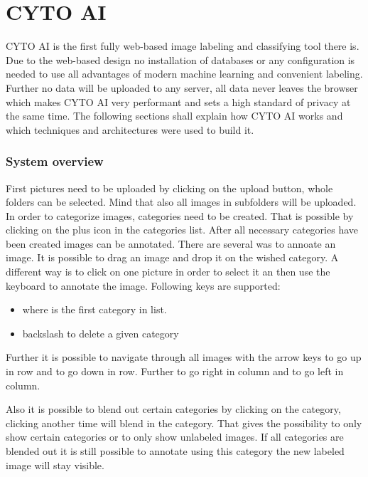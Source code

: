 \chapter{CYTO AI}
CYTO AI is the first fully web-based image labeling and classifying tool there is. Due to the web-based design no installation of databases or any configuration is needed to use all advantages of modern machine learning and convenient labeling. Further no data will be uploaded to any server, all data never leaves the browser which makes CYTO AI very performant and sets a high standard of privacy at the same time. The following sections shall explain how CYTO AI works and which techniques and architectures were used to build it.

\subsection{System overview}
First pictures need to be uploaded by clicking on the upload button, whole folders can be selected. Mind that also all images in subfolders will be uploaded. In order to categorize images, categories need to be created. That is possible by clicking on the plus icon in the categories list. After all necessary categories have been created images can be annotated. There are several was to annoate an image. It is possible to drag an image and drop it on the wished category. A different way is to click on one picture in order to select it an then use the keyboard to annotate the image. Following keys are supported:

\begin{itemize}
	\item {}      
	   where  is the first category in list.
	\item \keystroke{$\Leftarrow$} backslash to delete a given category
\end{itemize}

Further it is possible to navigate through all images with the arrow keys \keystroke{$\Uparrow$} to go up in row and 
 \keystroke{$\Downarrow$} to go down in row. Further \keystroke{$\Rightarrow$} to go right in column and \keystroke{$\Leftarrow$} to go left in column.


Also it is possible to blend out certain categories by clicking on the category, clicking another time will blend in the category. That gives the possibility to only show certain categories or to only show unlabeled images.
If all categories are blended out it is still possible to annotate using this category the new labeled image will stay visible.

